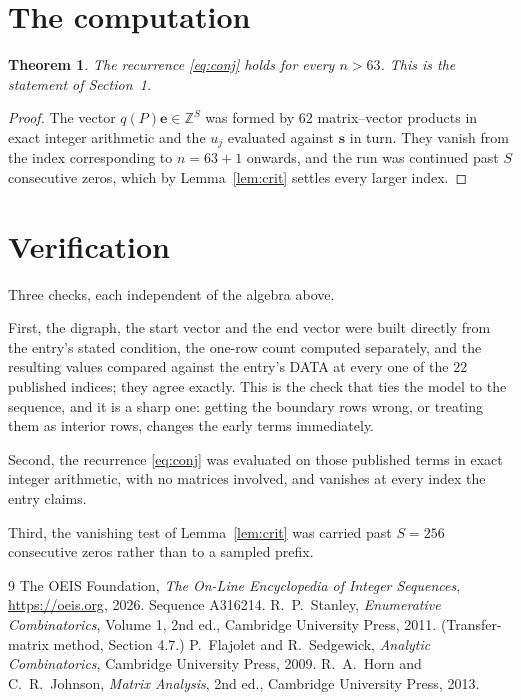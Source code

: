 \documentclass[11pt,a4paper]{article}
\theoremstyle{plain}
\newtheorem{theorem}{Theorem}
\theoremstyle{definition}
\begin{document}
\section{The computation}

\begin{theorem}
The recurrence \eqref{eq:conj} holds for every $n>63$. This is the statement of
Section~1.
\end{theorem}

\begin{proof}
The vector $q(P)\mathbf{e}\in\mathbb{Z}^{S}$ was formed by $62$ matrix--vector
products in exact integer arithmetic and the $u_j$ evaluated against $\mathbf{s}$ in turn.
They vanish from the index corresponding to $n=63+1$ onwards, and the run was continued
past $S$ consecutive zeros, which by Lemma~\ref{lem:crit} settles every larger index.
\end{proof}

\section{Verification}

Three checks, each independent of the algebra above.

First, the digraph, the start vector and the end vector were built directly from the
entry's stated condition, the one-row count computed separately, and the resulting values
compared against the entry's DATA at every one of the $22$ published indices; they
agree exactly. This is the check that ties the model to the sequence, and it is a sharp one:
getting the boundary rows wrong, or treating them as interior rows, changes the early terms
immediately.

Second, the recurrence \eqref{eq:conj} was evaluated on those published terms in exact
integer arithmetic, with no matrices involved, and vanishes at every index the entry claims.

Third, the vanishing test of Lemma~\ref{lem:crit} was carried past $S=256$ consecutive
zeros rather than to a sampled prefix.

\begin{thebibliography}{9}
 The OEIS Foundation, \emph{The On-Line Encyclopedia of Integer
Sequences}, \url{https://oeis.org}, 2026. Sequence A316214.
 R.~P.~Stanley, \emph{Enumerative Combinatorics}, Volume 1, 2nd ed.,
Cambridge University Press, 2011. (Transfer-matrix method, Section 4.7.)
 P.~Flajolet and R.~Sedgewick, \emph{Analytic Combinatorics}, Cambridge
University Press, 2009.
 R.~A.~Horn and C.~R.~Johnson, \emph{Matrix Analysis}, 2nd ed., Cambridge
University Press, 2013.
\end{thebibliography}
\end{document}
